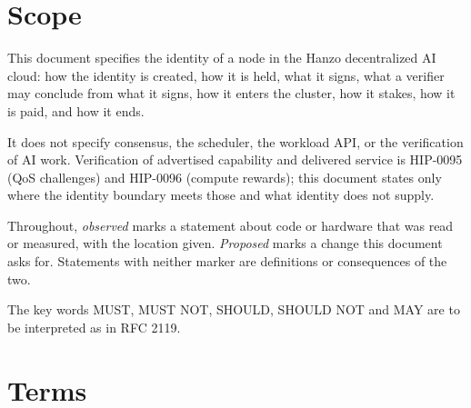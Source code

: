 \documentclass[11pt,a4paper]{article}
\begin{document}
\tableofcontents

\section{Scope}

This document specifies the identity of a node in the Hanzo decentralized AI
cloud: how the identity is created, how it is held, what it signs, what a
verifier may conclude from what it signs, how it enters the cluster, how it
stakes, how it is paid, and how it ends.

It does not specify consensus, the scheduler, the workload API, or the
verification of AI work. Verification of advertised capability and delivered
service is HIP-0095 (QoS challenges) and HIP-0096 (compute rewards); this
document states only where the identity boundary meets those and what identity
does not supply.

Throughout, \emph{observed} marks a statement about code or hardware that was
read or measured, with the location given. \emph{Proposed} marks a change this
document asks for. Statements with neither marker are definitions or
consequences of the two.

The key words MUST, MUST NOT, SHOULD, SHOULD NOT and MAY are to be interpreted as
in RFC 2119.

\section{Terms}
\end{document}
